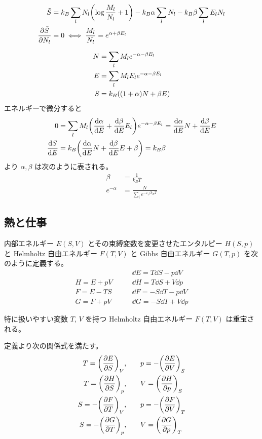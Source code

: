 \documentclass[uplatex,dvipdfmx,a4paper,11pt]{jlreq}
\theoremstyle{definition}
\begin{document}
\begin{align}
  \tilde{S}            & = k_B\sum_{l}N_l\qty(\log\frac{M_l}{N_l} + 1) - k_B\alpha\sum_{l}N_l - k_B\beta\sum_{l}E_lN_l \\
  \pdv{\tilde{S}}{N_l} & = 0 \iff \frac{M_l}{N_l} = e^{\alpha + \beta E_l}
\end{align}

\begin{align}
  N & = \sum_{l}M_le^{-\alpha-\beta E_l}    \\
  E & = \sum_{l}M_lE_le^{-\alpha-\beta E_l} \\
  S & = k_B\qty((1 + \alpha)N + \beta E)
\end{align}
エネルギーで微分すると
\begin{align}
  0         & = \sum_{l}M_l\qty(\dv{\alpha}{E} + \dv{\beta}{E}E_l)e^{-\alpha-\beta E_l} = \dv{\alpha}{E}N + \dv{\beta}{E}E \\
  \dv{S}{E} & = k_B\qty(\dv{\alpha}{E}N + \dv{\beta}{E}E + \beta) = k_B\beta
\end{align}
より $\alpha, \beta$ は次のように表される。
\begin{align}
  \beta       & = \frac{1}{k_BT}                            \\
  e^{-\alpha} & = \frac{N}{\sum_{i}e^{-\varepsilon_i/k_BT}}
\end{align}


\subsection{熱と仕事}
\begin{definition}
  内部エネルギー $E(S, V)$ とその束縛変数を変更させたエンタルピー $H(S, p)$ と Helmholtz 自由エネルギー $F(T, V)$ と Gibbs 自由エネルギー $G(T, p)$ を次のように定義する。
  \begin{align}
               & \qquad \dd{E} = T\dd{S} - p\dd{V}  \\
    H = E + pV & \qquad \dd{H} = T\dd{S} + V\dd{p}  \\
    F = E - TS & \qquad \dd{F} = -S\dd{T} - p\dd{V} \\
    G = F + pV & \qquad \dd{G} = -S\dd{T} + V\dd{p}
  \end{align}
\end{definition}
特に扱いやすい変数 $T$, $V$ を持つ Helmholtz 自由エネルギー $F(T, V)$ は重宝される。
\begin{proposition}
  定義より次の関係式を満たす。
  \begin{align}
    T = \qty(\pdv{E}{S})_V,  & \qquad p = -\qty(\pdv{E}{V})_S \\
    T = \qty(\pdv{H}{S})_p,  & \qquad V = \qty(\pdv{H}{p})_S  \\
    S = -\qty(\pdv{F}{T})_V, & \qquad p = -\qty(\pdv{F}{V})_T \\
    S = -\qty(\pdv{G}{T})_p, & \qquad V = \qty(\pdv{G}{p})_T
  \end{align}
\end{proposition}
\end{document}
